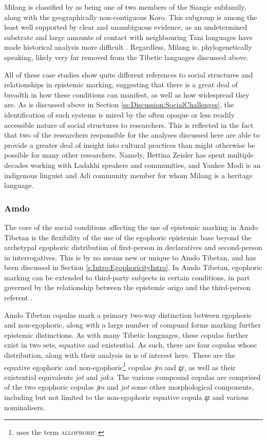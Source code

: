 Milang is classified by  as being one of two members of the Siangic subfamily, along with the geographically non-contiguous Koro. This subgroup is among the least well supported by clear and unambiguous evidence, as an undetermined substrate and large amounts of contact with neighbouring Tani languages have made historical analysis more difficult \cite{Modi2017}. Regardless, Milang is, phylogenetically speaking, likely very far removed from the Tibetic languages discussed above.

All of these case studies show quite different references to social structures and relationships in epistemic marking, suggesting that there is a great deal of breadth in how these conditions can manifest, as well as how widespread they are. As is discussed above in Section \ref{ss:Discussion:SocialChallenges}, the identification of such systems is mired by the often opaque or less readily accessible nature of social structures to researchers. This is reflected in the fact that two of the researchers responsible for the analyses discussed here are able to provide a greater deal of insight into cultural practices than might otherwise be possible for many other researchers. Namely, Bettina Zeisler has spent multiple decades working with Ladakhi speakers and communities, and Yankee Modi is an indigenous linguist and Adi community member for whom Milang is a heritage language.

\subsubsection{Amdo}\label{sss:Discussion:AmdoCase}
The core of the social conditions affecting the use of epistemic marking in Amdo Tibetan is the flexibility of the use of the egophoric epistemic base beyond the archetypal egophoric distribution of first-person in declaratives and second-person in interrogatives. This is by no means new or unique to Amdo Tibetan, and has been discussed in Section \ref{s:Intro:EgophoricityIntro}. In Amdo Tibetan, egophoric marking can be extended to third-party subjects in certain conditions, in part governed by the relationship between the epistemic origo and the third-person referent \cite{Tribur2019}.

Amdo Tibetan copulas mark a primary two-way distinction between egophoric and non-egophoric, along with a large number of compund forms marking further epistemic distinctions. As with many Tibetic languages, these copulas further exist in two sets, equative and existential. As such, there are four copulas whose distribution, along with their analysis in  is of interest here. These are the equative egophoric and non-egophoric\footnote{ uses the term \textsc{allophoric}.} copulas \textit{jɪn} and \textit{ʐɛ}, as well as their existential equivalents \textit{jot} and \textit{jokə}. The various compound copulas are comprised of the two egophoric copulas \textit{jɪn} and \textit{jot} some other morphological components, including but not limited to the non-egophoric equative copula \textit{ʐɛ} and various nominalisers.

